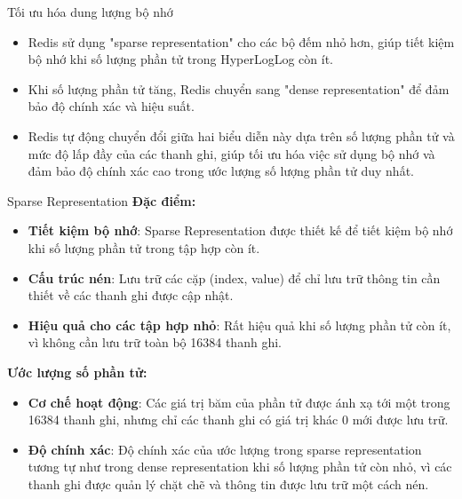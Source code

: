 \documentclass[10pt]{beamer}
\begin{document}
\begin{frame}[fragile]{Tối ưu hóa dung lượng bộ nhớ}
  \begin{itemize}
    \item Redis sử dụng "sparse representation" cho các bộ đếm nhỏ hơn, 
    giúp tiết kiệm bộ nhớ khi số lượng phần tử trong HyperLogLog còn ít.
    \item Khi số lượng phần tử tăng, Redis chuyển sang "dense representation" 
    để đảm bảo độ chính xác và hiệu suất.
    \item Redis tự động chuyển đổi giữa hai biểu diễn này dựa trên số lượng 
    phần tử và mức độ lấp đầy của các thanh ghi, giúp tối ưu hóa việc 
    sử dụng bộ nhớ và đảm bảo độ chính xác cao trong ước lượng số lượng 
    phần tử duy nhất.
  \end{itemize}
\end{frame}

\begin{frame}[fragile]{Sparse Representation}
  \textbf{Đặc điểm:}
  \begin{itemize}
    \item \textbf{Tiết kiệm bộ nhớ}: Sparse Representation được thiết kế để 
    tiết kiệm bộ nhớ khi số lượng phần tử trong tập hợp còn ít.
    \item \textbf{Cấu trúc nén}: Lưu trữ các cặp (index, value) để chỉ 
    lưu trữ thông tin cần thiết về các thanh ghi được cập nhật.
    \item \textbf{Hiệu quả cho các tập hợp nhỏ}: Rất hiệu quả khi số lượng 
    phần tử còn ít, vì không cần lưu trữ toàn bộ 16384 thanh ghi.
  \end{itemize}
  \textbf{Ước lượng số phần tử:}
  \begin{itemize}
    \item \textbf{Cơ chế hoạt động}: Các giá trị băm của phần tử được ánh xạ 
    tới một trong 16384 thanh ghi, nhưng chỉ các thanh ghi có giá trị 
    khác 0 mới được lưu trữ.
    \item \textbf{Độ chính xác}: Độ chính xác của ước lượng trong sparse representation tương tự như trong dense representation khi số lượng phần tử còn nhỏ, vì các thanh ghi được quản lý chặt chẽ và thông tin được lưu trữ một cách nén.
  \end{itemize}
\end{frame}
\end{document}
